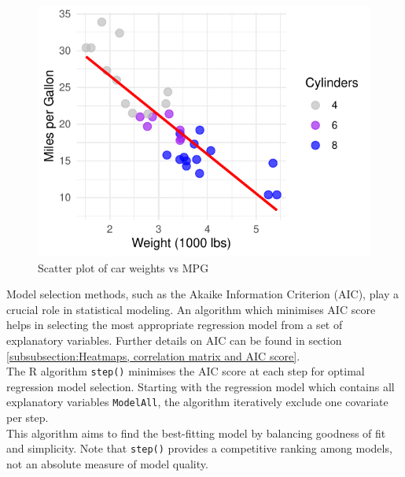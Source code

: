 \documentclass{article}\usepackage[]{graphicx}\usepackage[]{xcolor}
\makeatletter
\def\maxwidth{ %
  \ifdim\Gin@nat@width>\linewidth
    \linewidth
  \else
    \Gin@nat@width
  \fi
}
\newenvironment{knitrout}{}{} %
\makeatother
\begin{document}
\begin{knitrout}\scriptsize
{}\color{fgcolor}\begin{figure}[H]

{\centering \includegraphics[width=\maxwidth]{figure/beamer-scatter-plot-1} 

}

\caption[Scatter plot of car weights vs MPG]{Scatter plot of car weights vs MPG}\label{fig:scatter-plot}
\end{figure}

\end{knitrout}

\noindent
Model selection methods, such as the Akaike Information Criterion (AIC), play a crucial role in statistical modeling. An algorithm which minimises AIC score helps in selecting the most appropriate regression model from a set of explanatory variables. Further details on AIC can be found in section  \ref{subsubsection:Heatmaps, correlation matrix and AIC score}.\\

\noindent
The R algorithm \texttt{step()} minimises the AIC score at each step for optimal regression model selection. Starting with the regression model which contains all explanatory variables \texttt{ModelAll}, the algorithm iteratively exclude one covariate per step.\\

\noindent
This algorithm aims to find the best-fitting model by balancing goodness of fit and simplicity. Note that \texttt{step()} provides a competitive ranking among models, not an absolute measure of model quality.\\
\end{document}
